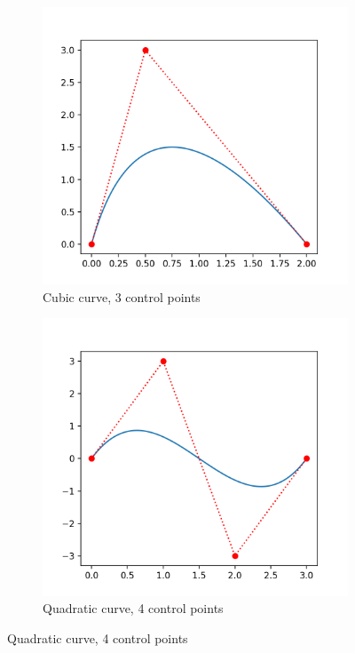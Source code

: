 \documentclass[12pt, letterpaper]{article}
\begin{document}
\begin{figure}[ht]
  \label{fig:BezierCurves1}
  \caption{Cubic and Quadratic Curves, Listing~\ref{lst:bez}}
  \begin{center}
    \begin{subfigure}[b]{.45\linewidth}
      \includegraphics[width=\linewidth]{Bez/cubicBez1}
      \caption{Cubic curve, 3 control points}
    \end{subfigure}
    \begin{subfigure}[b]{.45\linewidth}
      \includegraphics[width=\linewidth]{Bez/quadraticBez1}
      \caption{Quadratic curve, 4 control points}
    \end{subfigure}
  \end{center}
\end{figure}
\end{document}
